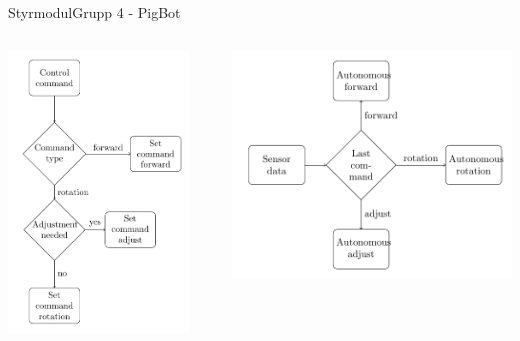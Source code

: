 \begin{frame}{Styrmodul}{Grupp 4 - PigBot}
	\begin{columns}
		\begin{column}{0.5\textwidth}
			\includegraphics[width=0.9\textwidth]{images/controllerControlFlow.pdf}
		\end{column}
		\pause
    		\begin{column}{0.5\textwidth}
      			\includegraphics[width=\textwidth]{images/controllerSensorFlow.pdf}
    		\end{column}
  	\end{columns}
\end{frame}

